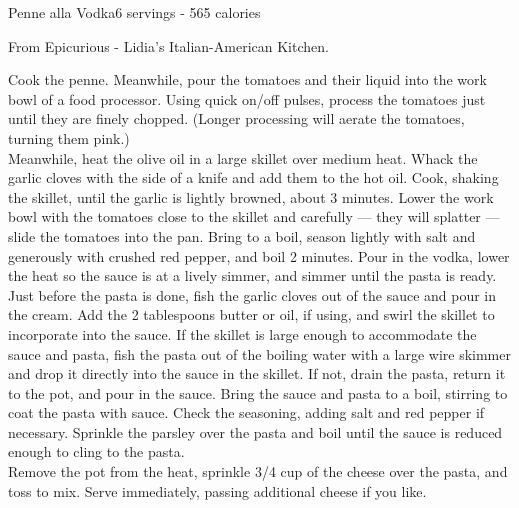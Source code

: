 \begin{recipe}{Penne alla Vodka}{6 servings - 565 calories}{}

\freeform From Epicurious - Lidia's Italian-American Kitchen.


Cook the penne. Meanwhile, pour the tomatoes and their liquid into the work bowl of a food processor. Using quick on/off pulses, process the tomatoes just until they are finely chopped. (Longer processing will aerate the tomatoes, turning them pink.)\\

Meanwhile, heat the olive oil in a large skillet over medium heat. Whack the garlic cloves with the side of a knife and add them to the hot oil. Cook, shaking the skillet, until the garlic is lightly browned, about 3 minutes. Lower the work bowl with the tomatoes close to the skillet and carefully — they will splatter — slide the tomatoes into the pan. Bring to a boil, season lightly with salt and generously with crushed red pepper, and boil 2 minutes. Pour in the vodka, lower the heat so the sauce is at a lively simmer, and simmer until the pasta is ready.\\

Just before the pasta is done, fish the garlic cloves out of the sauce and pour in the cream. Add the 2 tablespoons butter or oil, if using, and swirl the skillet to incorporate into the sauce. If the skillet is large enough to accommodate the sauce and pasta, fish the pasta out of the boiling water with a large wire skimmer and drop it directly into the sauce in the skillet. If not, drain the pasta, return it to the pot, and pour in the sauce. Bring the sauce and pasta to a boil, stirring to coat the pasta with sauce. Check the seasoning, adding salt and red pepper if necessary. Sprinkle the parsley over the pasta and boil until the sauce is reduced enough to cling to the pasta.\\

Remove the pot from the heat, sprinkle 3/4 cup of the cheese over the pasta, and toss to mix. Serve immediately, passing additional cheese if you like.\\

\end{recipe}